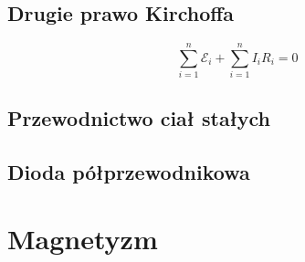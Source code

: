 \documentclass{article}
\numberwithin{equation}{section}
\begin{document}
    \subsection{Drugie prawo Kirchoffa}
      \begin{equation}
        \sum_{i=1}^n \mathcal E_i + \sum_{i=1}^n I_iR_i = 0
      \end{equation}
    \subsection{Przewodnictwo ciał stałych}
    \subsection{Dioda półprzewodnikowa}

  \newpage
  \section{Magnetyzm}
\end{document}
